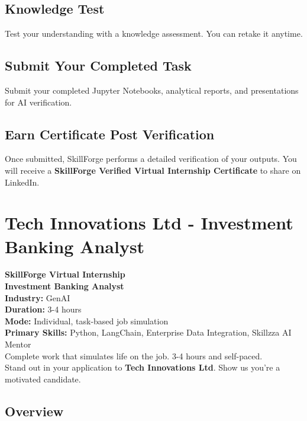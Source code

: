 \documentclass{article}
\begin{document}
\subsection*{Knowledge Test}
Test your understanding with a knowledge assessment. You can retake it anytime.\\

\subsection*{Submit Your Completed Task}
Submit your completed Jupyter Notebooks, analytical reports, and presentations for AI verification.\\

\subsection*{Earn Certificate Post Verification}
Once submitted, SkillForge performs a detailed verification of your outputs. You will receive a \textbf{SkillForge Verified Virtual Internship Certificate} to share on LinkedIn.\\

\newpage

\section{Tech Innovations Ltd - Investment Banking Analyst}

\textbf{SkillForge Virtual Internship} \\
\textbf{Investment Banking Analyst} \\

\textbf{Industry:} GenAI \\
\textbf{Duration:} 3-4 hours \\
\textbf{Mode:} Individual, task-based job simulation \\
\textbf{Primary Skills:} Python, LangChain, Enterprise Data Integration, Skillzza AI Mentor \\

Complete work that simulates life on the job. 3-4 hours and self-paced. \\
Stand out in your application to \textbf{Tech Innovations Ltd}. Show us you're a motivated candidate. \\

\subsection*{Overview}
\end{document}
